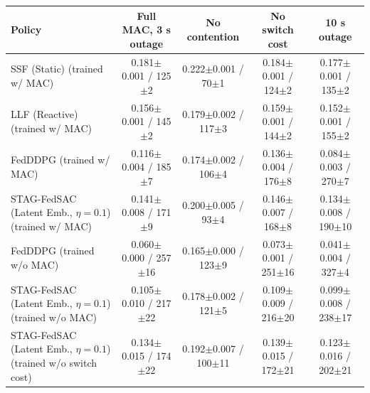 \begin{tabular}{lcccc}
\toprule
Policy & Full MAC, 3 s outage & No contention & No switch cost & 10 s outage \\
\midrule
SSF (Static) (trained w/ MAC) & 0.181{\tiny$\pm$0.001} / 125{\tiny$\pm$2} & 0.222{\tiny$\pm$0.001} / 70{\tiny$\pm$1} & 0.184{\tiny$\pm$0.001} / 124{\tiny$\pm$2} & 0.177{\tiny$\pm$0.001} / 135{\tiny$\pm$2} \\
LLF (Reactive) (trained w/ MAC) & 0.156{\tiny$\pm$0.001} / 145{\tiny$\pm$2} & 0.179{\tiny$\pm$0.002} / 117{\tiny$\pm$3} & 0.159{\tiny$\pm$0.001} / 144{\tiny$\pm$2} & 0.152{\tiny$\pm$0.001} / 155{\tiny$\pm$2} \\
FedDDPG (trained w/ MAC) & 0.116{\tiny$\pm$0.004} / 185{\tiny$\pm$7} & 0.174{\tiny$\pm$0.002} / 106{\tiny$\pm$4} & 0.136{\tiny$\pm$0.004} / 176{\tiny$\pm$8} & 0.084{\tiny$\pm$0.003} / 270{\tiny$\pm$7} \\
STAG-FedSAC (Latent Emb., $\eta{=}0.1$) (trained w/ MAC) & 0.141{\tiny$\pm$0.008} / 171{\tiny$\pm$9} & 0.200{\tiny$\pm$0.005} / 93{\tiny$\pm$4} & 0.146{\tiny$\pm$0.007} / 168{\tiny$\pm$8} & 0.134{\tiny$\pm$0.008} / 190{\tiny$\pm$10} \\
FedDDPG (trained w/o MAC) & 0.060{\tiny$\pm$0.000} / 257{\tiny$\pm$16} & 0.165{\tiny$\pm$0.000} / 123{\tiny$\pm$9} & 0.073{\tiny$\pm$0.001} / 251{\tiny$\pm$16} & 0.041{\tiny$\pm$0.004} / 327{\tiny$\pm$4} \\
STAG-FedSAC (Latent Emb., $\eta{=}0.1$) (trained w/o MAC) & 0.105{\tiny$\pm$0.010} / 217{\tiny$\pm$22} & 0.178{\tiny$\pm$0.002} / 121{\tiny$\pm$5} & 0.109{\tiny$\pm$0.009} / 216{\tiny$\pm$20} & 0.099{\tiny$\pm$0.008} / 238{\tiny$\pm$17} \\
STAG-FedSAC (Latent Emb., $\eta{=}0.1$) (trained w/o switch cost) & 0.134{\tiny$\pm$0.015} / 174{\tiny$\pm$22} & 0.192{\tiny$\pm$0.007} / 100{\tiny$\pm$11} & 0.139{\tiny$\pm$0.015} / 172{\tiny$\pm$21} & 0.123{\tiny$\pm$0.016} / 202{\tiny$\pm$21} \\
\bottomrule
\end{tabular}
